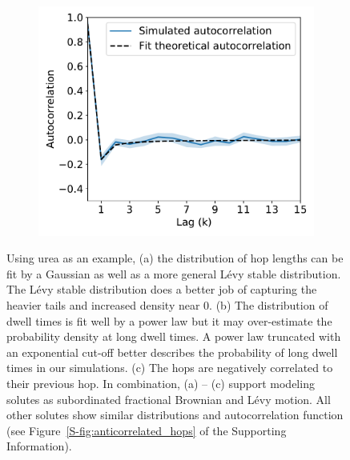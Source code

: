 \documentclass[aps,pre,preprint,groupedaddress]{revtex4-2}
\begin{document}
\begin{figure}
\begin{subfigure}{0.325\textwidth}
  \includegraphics[width=\textwidth]{URE_hop_acf.pdf}
  \caption{}\label{fig:hop_acf}
  \end{subfigure}
  \caption{Using urea as an example, (a) the distribution of hop lengths can be fit by 
  a Gaussian as well as a more general L\'evy stable distribution. The L\'evy stable
  distribution does a better job of capturing the heavier tails and increased density
  near 0. (b) The distribution of dwell times is fit well by a power law but it may 
  over-estimate the probability density at long dwell times. A power law truncated with
  an exponential cut-off 
  better describes
  the probability of long dwell times in 
  our simulations. (c) The hops are negatively correlated to their previous hop. In
  combination, (a) -- (c) support modeling solutes as subordinated fractional Brownian
  and L\'evy motion. All other solutes show similar distributions and autocorrelation
  function (see Figure~\ref{S-fig:anticorrelated_hops} of the Supporting Information).
  }\label{fig:anticorrelated_hops}
  \end{figure}
  
\end{document}
